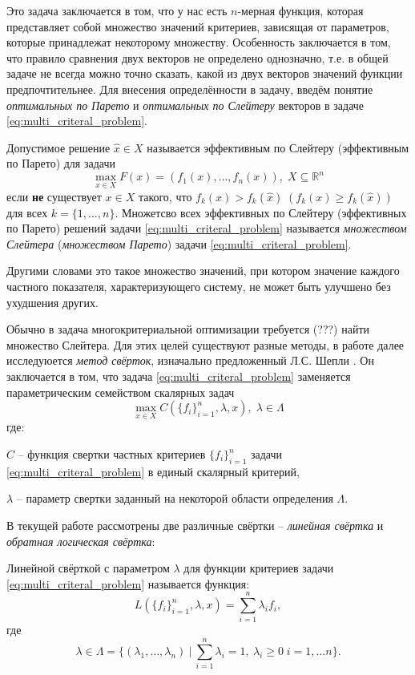 Это задача заключается в том, что у нас есть $n$-мерная функция,
которая представляет собой множество значений критериев, зависящая
от параметров, которые принадлежат некоторому множеству.
Особенность заключается в том, что правило сравнения двух векторов
не определено однозначно, т.е. в общей задаче не всегда можно точно сказать,
какой из двух векторов значений функции предпочтительнее.
Для внесения определённости в задачу, введём понятие
\textit{оптимальных по Парето} и \textit{оптимальных по Слейтеру}
векторов в задаче \eqref{eq:multi_criteral_problem}.

\begin{Def}
	Допустимое решение $\hat{x}\in{X}$ называется 
	эффективным по Слейтеру (эффективным по Парето) для задачи
	$$	
		\max\limits_{x \in X} F(x)=({f}_1(x),\ldots, {f}_n(x))
		, \; X \subseteq \mathbb{R}^n	
	$$	
	если \textbf{не} существует $x\in{X}$ такого, что 
	$f_k(x)>f_k(\hat{x}) \; (f_k(x) \geqslant f_k(\hat{x}))$ для всех
	$k=\{1,...,n\}$. Множетсво всех эффективных по Слейтеру 
	(эффективных по Парето) решений задачи 
	\eqref{eq:multi_criteral_problem} называется 
	\textit{множеством Слейтера} (\textit{множеством Парето}) 
	задачи \eqref{eq:multi_criteral_problem}.
\end{Def}

Другими словами это такое множество значений, 
при котором значение каждого частного показателя, характеризующего систему, не может быть улучшено без ухудшения других.

Обычно в задача многокритериальной оптимизации требуется (???)
найти множество Слейтера. Для этих целей существуют разные методы,
в работе далее исследуюется \textit{метод свёрток},
изначально предложенный Л.С. Шепли \cite{shapley}. 
Он заключается в том, что задача \eqref{eq:multi_criteral_problem}
заменяется параметрическим семейством скалярных задач 
	$$
		\max\limits_{x \in X} C(\{f_i\}_{i=1}^{n}, \lambda, x), \;
		\lambda \in \Lambda
	$$
	где: 
 
	$C$ – функция свертки частных критериев $\{f_i\}_{i=1}^n$ задачи 
\eqref{eq:multi_criteral_problem} в единый скалярный критерий,
 
	$\lambda$ – параметр свертки заданный на некоторой
области определения $\Lambda$.
\newline

В текущей работе рассмотрены две различные свёртки --
\textit{линейная свёртка} и \textit{обратная логическая свёртка}:

\begin{Def}
	Линейной свёрткой с параметром $\lambda$ для функции критериев задачи
	\eqref{eq:multi_criteral_problem} называется функция:
	\begin{equation}
		L(\{f_i\}_{i=1}^{n}, \lambda, x) = 
		\sum_{i=1}^{n} \lambda_i f_i,
		\label{eq:linear_scalarization}
	\end{equation}
	где  
	\begin{equation}
		\lambda \in 
		\Lambda = \{
			(\lambda_1, \ldots, \lambda_n) \:
			| \: \sum_{i=1}^n \lambda_i = 1, \: 
			  \lambda_i \geq 0 \; i = 1, \ldots n 
		\}.		
		\label{eq:Lambda}
	\end{equation}
\end{Def}

